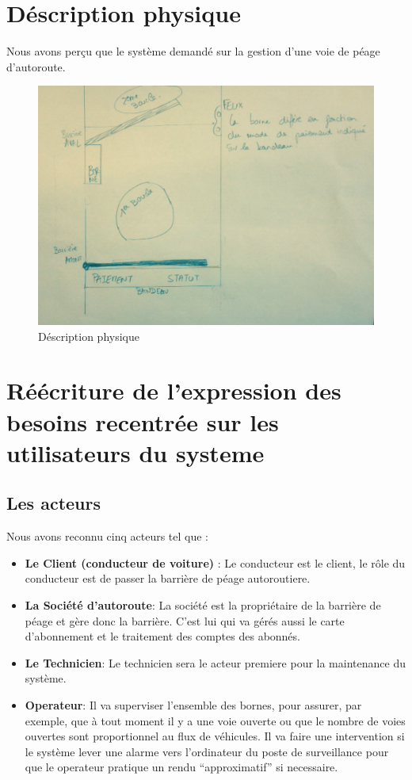\label{Cap:TD1}


\section{Déscription physique}
Nous avons perçu que le système demandé sur la gestion d’une voie de péage d’autoroute.

\begin{figure}[h]
    \centering
    \includegraphics[scale=0.7]{images/a.png}
    \caption{Déscription physique}
    \label{fig:my_label}
\end{figure}
\newpage
\section{Réécriture de l'expression des besoins recentrée sur les utilisateurs du systeme}
\subsection{Les acteurs} 
Nous avons reconnu cinq acteurs  tel que :
\begin{itemize}
    \item \textbf{Le Client (conducteur de voiture)
}: Le conducteur est le client, le rôle du conducteur est de passer la barrière de péage autoroutiere. 
    \item \textbf{La Société d’autoroute}: 	La société est la propriétaire de la barrière de péage et gère donc la barrière. C’est lui qui va gérés aussi le carte d’abonnement et le traitement des comptes des abonnés. 
    \item \textbf{Le Technicien}: Le technicien sera le acteur premiere pour la maintenance du système.  
    \item \textbf{Operateur}: Il va superviser l’ensemble des bornes, pour assurer, par exemple, que à tout moment il y a une voie ouverte ou que le nombre de voies ouvertes sont proportionnel au flux de véhicules. Il va faire une intervention si le système lever une alarme vers l’ordinateur du poste de surveillance pour que le operateur pratique un rendu “approximatif” si necessaire.
\end{itemize}

